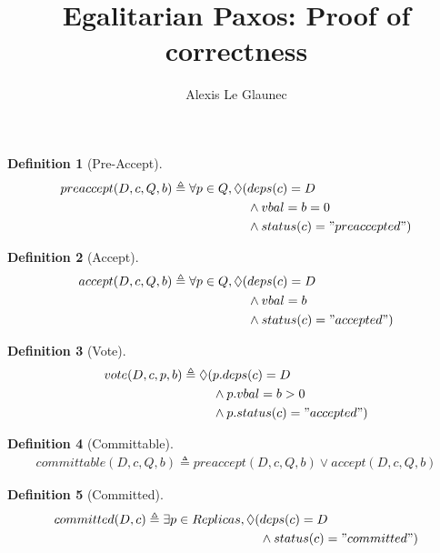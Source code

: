 \documentclass[a4paper]{article}
\title{Egalitarian Paxos: Proof of correctness}
\author{Alexis Le Glaunec}
\theoremstyle{definition}
\newtheorem{definition}{Definition}
\theoremstyle{plain}
\begin{document}
\maketitle




\begin{definition}[Pre-Accept]
\begin{align*}
preaccept(D,c,Q,b) \triangleq \forall p \in Q, \lozenge( & deps(c)=D \\
                                                         & \wedge vbal=b=0 \\
                                                         & \wedge status(c) = "preaccepted")
\end{align*}
\end{definition}

\begin{definition}[Accept]
\begin{align*}
    accept(D,c,Q,b) \triangleq \forall p \in Q, \lozenge( & deps(c)=D \\
                                                             &\wedge vbal=b \\
                                                             &\wedge status(c) = "accepted")
\end{align*}
\end{definition}

\begin{definition}[Vote]
\begin{align*}
    vote(D,c,p,b) \triangleq  \lozenge( & p.deps(c)=D \\
                                                             &\wedge p.vbal=b > 0 \\
                                                             &\wedge p.status(c) = "accepted")
\end{align*}
\end{definition}


\begin{definition}[Committable]
\begin{align*}
    committable(D,c,Q,b) \triangleq  preaccept(D,c,Q,b) \vee accept(D,c,Q,b)
\end{align*}
\end{definition}

\begin{definition}[Committed]
\begin{align*}
    committed(D,c) \triangleq  \exists p \in Replicas, \lozenge(& deps(c) = D \\
                                                                &\wedge status(c) = "committed") 
\end{align*}

\end{definition}
\end{document}
